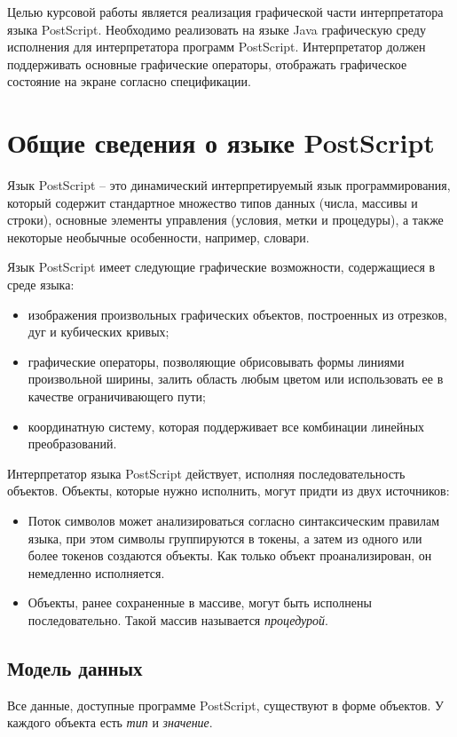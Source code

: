 \documentclass[14pt]{extarticle}
\begin{document}
Целью курсовой работы является реализация графической части интерпретатора языка PostScript.  Необходимо реализовать на языке Java графическую среду исполнения для интерпретатора программ PostScript. Интерпретатор должен поддерживать основные графические операторы, отображать графическое состояние на экране согласно спецификации.


\pagebreak

\section{Общие сведения о языке PostScript}
Язык PostScript – это динамический интерпретируемый язык программирования, который содержит стандартное множество типов данных (числа, массивы и строки), основные элементы управления (условия, метки и процедуры), а также некоторые необычные особенности, например, словари. 


Язык PostScript имеет следующие графические возможности, содержащиеся в среде языка:
\begin{itemize}
\item изображения произвольных графических объектов, построенных из отрезков, дуг и кубических кривых;
\item графические операторы, позволяющие обрисовывать формы линиями произвольной ширины, залить область любым цветом или использовать ее в качестве ограничивающего пути;
\item координатную систему, которая поддерживает все комбинации линейных преобразований.
\end{itemize}

 
Интерпретатор  языка PostScript действует, исполняя последовательность объектов. Объекты, которые нужно исполнить, могут придти из двух источников:
\begin{itemize}
\item Поток символов может анализироваться согласно синтаксическим правилам языка, при этом символы группируются в токены, а затем из одного или более токенов создаются объекты. Как только объект проанализирован, он немедленно исполняется. 
\item Объекты, ранее сохраненные в массиве, могут быть исполнены последовательно. Такой массив называется \textit{процедурой}.
\end{itemize} 
 
\subsection{Модель данных}
Все данные, доступные программе PostScript, существуют в форме объектов. У каждого объекта есть \textit{тип} и \textit{значение}. %
\end{document}
